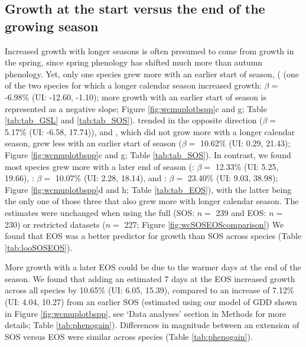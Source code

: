 \documentclass{article}\usepackage[]{graphicx}\usepackage[]{xcolor}
\begin{document}
\subsection*{Growth at the start versus the end of the growing season}
Increased growth with longer seasons is often presumed to come from growth in the spring, since spring phenology has shifted much more than autumn phenology. Yet, only one species grew more with an earlier start of season, ({\Ainc} (one of the two species for which a longer calendar season increased growth: $\beta =$
-6.98\% (UI: -12.60, -1.10); more growth with an earlier start of season is represented as a negative slope; Figure \ref{fig:wcmuplotbspp}c and g; Table \ref{tab:tab_GSL} and \ref{tab:tab_SOS}). {\Bpop} trended in the opposite direction ($\beta =$
5.17\% (UI: -6.58, 17.74)), and {\Ball}, which did not grow more with a longer calendar season, grew less with an earlier start of season ($\beta =$
10.62\% (UI: 0.29, 21.43); Figure \ref{fig:wcmuplotbspp}c and g; Table \ref{tab:tab_SOS}). In contrast, we found most species grew more with a later end of season ({\Ball}: $\beta =$ 
12.33\% (UI: 5.25, 19.66), {\Bpop}: $\beta =$
10.07\% (UI: 2.28, 18.14), and {\Bpap}: $\beta =$
23.40\% (UI: 9.03, 38.98); Figure \ref{fig:wcmuplotbspp}d and h; Table \ref{tab:tab_EOS}), with the latter being the only one of those three that also grew more with longer calendar season. The estimates were unchanged when using the full (SOS: $n =$
239 and EOS: $n =$
230) or restricted datasets ($n =$ 
227; Figure \ref{fig:wcSOSEOScomparison}) We found that EOS was a better predictor for growth than SOS across species (Table \ref{tab:looSOSEOS}).

More growth with a later EOS could be due to the warmer days at the end of the season. We found that adding an estimated 7 days at the EOS increased growth across all species by 
10.65\% (UI: 6.05, 15.39), compared to an increase of
7.12\% (UI: 4.04, 10.27) from an earlier SOS (estimated using our model of GDD shown in Figure \ref{fig:wcmuplotbspp}, see `Data analyses' section in Methods for more details; Table \ref{tab:phenogain}). Differences in magnitude between an extension of SOS versus EOS were similar across species (Table \ref{tab:phenogain}).
\end{document}
